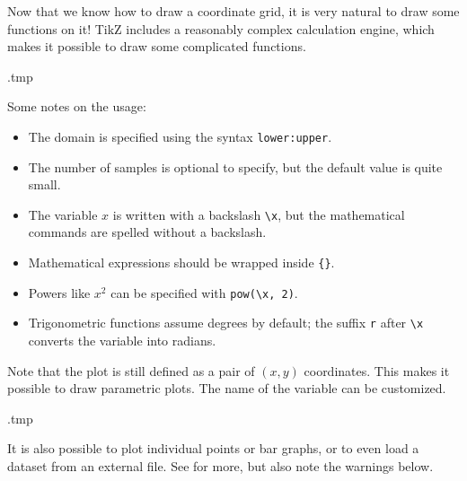 Now that we know how to draw a coordinate grid,
it is very natural to draw some functions on it!
TikZ includes a reasonably complex calculation engine,
which makes it possible to draw some complicated functions.
%
\begin{VerbatimOut}{\jobname.tmp}
\centering
{}
\end{VerbatimOut}
\ShowExampleBelow[2]
Some notes on the usage:
\begin{itemize}
\item The domain is specified using the syntax \verb|lower:upper|.
\item The number of samples is optional to specify, but the default value is quite small.
\item The variable $x$ is written with a backslash \verb|\x|,
    but the mathematical commands are spelled without a backslash.
\item Mathematical expressions should be wrapped inside \verb|{}|.
\item Powers like $x^2$ can be specified with \verb|pow(\x, 2)|.
\item Trigonometric functions assume degrees by default;
    the suffix \verb|r| after \verb|\x| converts the variable into radians.
\end{itemize}

Note that the plot is still defined as a pair of $(x,y)$ coordinates.
This makes it possible to draw parametric plots.
The name of the variable can be customized.
%
\begin{VerbatimOut}{\jobname.tmp}
\centering
{}
\end{VerbatimOut}
\ShowExampleBelow[2]

It is also possible to plot individual points or bar graphs,
or to even load a dataset from an external file.
See \cite[Section~22]{tikz} for more,
but also note the warnings below.

